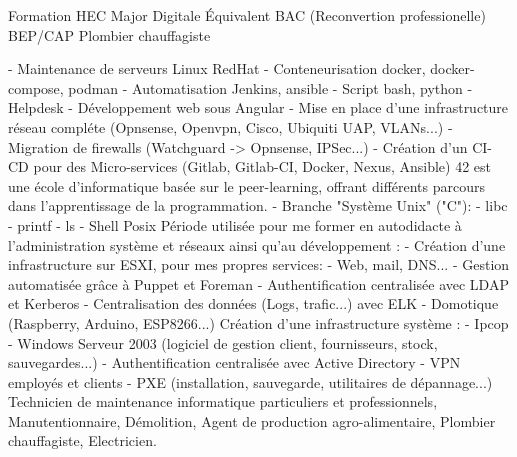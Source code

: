 \documentclass[
	a4paper,
]{FortySecondsCV/fortysecondscv}
\begin{document}
\makefrontsidebar

\begin{cvtable}[1.5]
		{Formation HEC Major Digitale}
		{Équivalent BAC (Reconvertion professionelle)}
		{BEP/CAP Plombier chauffagiste}
\end{cvtable}

\begin{cvtable}[3]
 	{
  		\tabto{2mm}- Maintenance de serveurs Linux RedHat
    		\tabto{2mm}- Conteneurisation docker, docker-compose, podman
      		\tabto{2mm}- Automatisation Jenkins, ansible
		\tabto{2mm}- Script bash, python
	}
 	{
  		\tabto{2mm}- Helpdesk
	}
		{
			\tabto{2mm}- Développement web sous Angular
			\tabto{2mm}- Mise en place  d'une infrastructure réseau compléte (Opnsense, Openvpn, Cisco, Ubiquiti UAP, VLANs...)
			\tabto{2mm}- Migration de firewalls (Watchguard -> Opnsense, IPSec...)
			\tabto{2mm}- Création d'un CI-CD pour des Micro-services (Gitlab, Gitlab-CI, Docker, Nexus, Ansible)
		}
	{
	42 est une école d'informatique basée sur le peer-learning, offrant différents parcours dans l'apprentissage de la programmation.
		\tabto{2mm}- Branche "Système Unix" ("C"):
   			\tabto{4mm}- libc
			\tabto{4mm}- printf
     		\tabto{4mm}- ls
     		\tabto{4mm}- Shell Posix
	}
	{
		Période utilisée pour me former en autodidacte à l'administration système et réseaux ainsi qu'au développement :
		\tabto{2mm}- Création d'une infrastructure sur ESXI, pour mes propres services:
			\tabto{4mm}- Web, mail, DNS...
			\tabto{4mm}- Gestion automatisée grâce à Puppet et Foreman
			\tabto{4mm}- Authentification centralisée avec LDAP et Kerberos
			\tabto{4mm}- Centralisation des données (Logs, trafic...) avec ELK
		\tabto{2mm}- Domotique (Raspberry, Arduino, ESP8266...)
	}
	{
		Création d'une infrastructure système :
			\tabto{2mm}- Ipcop
			\tabto{2mm}- Windows Serveur 2003 (logiciel de gestion client, fournisseurs, stock, sauvegardes...)
			\tabto{2mm}- Authentification centralisée avec Active Directory
			\tabto{2mm}- VPN employés et clients
			\tabto{2mm}- PXE (installation, sauvegarde, utilitaires de dépannage...)
	}
	{
		Technicien de maintenance informatique particuliers et professionnels, Manutentionnaire, Démolition, Agent de production agro-alimentaire, Plombier chauffagiste, Electricien.
	}
	{ }
\end{cvtable}
\end{document}
